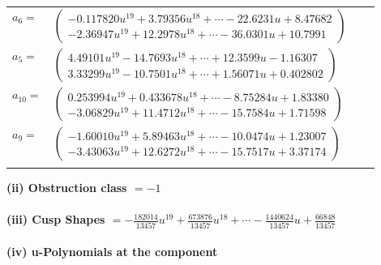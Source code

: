 \documentclass[1p]{elsarticle_modified}
\theoremstyle{definition}
\begin{document}
\begin{tabular}{m{7pt} m{180pt} m{7pt} m{180pt} }
\flushright $a_{6}=$&$\begin{pmatrix}-0.117820 u^{19}+3.79356 u^{18}+\cdots-22.6231 u+8.47682\\-2.36947 u^{19}+12.2978 u^{18}+\cdots-36.0301 u+10.7991\end{pmatrix}$ \\
\flushright $a_{5}=$&$\begin{pmatrix}4.49101 u^{19}-14.7693 u^{18}+\cdots+12.3599 u-1.16307\\3.33299 u^{19}-10.7501 u^{18}+\cdots+1.56071 u+0.402802\end{pmatrix}$ \\
\flushright $a_{10}=$&$\begin{pmatrix}0.253994 u^{19}+0.433678 u^{18}+\cdots-8.75284 u+1.83380\\-3.06829 u^{19}+11.4712 u^{18}+\cdots-15.7584 u+1.71598\end{pmatrix}$ \\
\flushright $a_{9}=$&$\begin{pmatrix}-1.60010 u^{19}+5.89463 u^{18}+\cdots-10.0474 u+1.23007\\-3.43063 u^{19}+12.6272 u^{18}+\cdots-15.7517 u+3.37174\end{pmatrix}$\\&\end{tabular}
\flushleft \textbf{(ii) Obstruction class $= -1$}\\~\\
\flushleft \textbf{(iii) Cusp Shapes $= -\frac{182014}{13457} u^{19}+\frac{673876}{13457} u^{18}+\cdots-\frac{1440624}{13457} u+\frac{66848}{13457}$}\\~\\
\newpage\renewcommand{\arraystretch}{1}
\flushleft \textbf{(iv) u-Polynomials at the component}\newline \\
\end{document}
